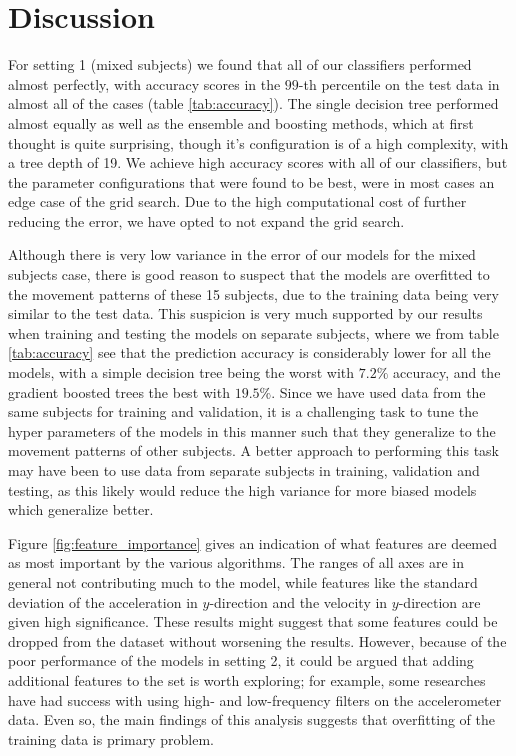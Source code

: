 \section{Discussion}\label{sec:Discussion}
For setting 1 (mixed subjects) we found that all of our classifiers performed almost perfectly, with accuracy scores in the $99$-th percentile on the test data in almost all of the cases (table \ref{tab:accuracy}). The single decision tree performed almost equally as well as the ensemble and boosting methods, which at first thought is quite surprising, though it's configuration is of a high complexity, with a tree depth of 19. We achieve high accuracy scores with all of our classifiers, but the parameter configurations that were found to be best, were in most cases an edge case of the grid search. Due to the high computational cost of further reducing the error, we have opted to not expand the grid search. 

Although there is very low variance in the error of our models for the mixed subjects case, there is good reason to suspect that the models are overfitted to the movement patterns of these 15 subjects, due to the training data being very similar to the test data. This suspicion is very much supported by our results when training and testing the models on separate subjects, where we from table \ref{tab:accuracy} see that the prediction accuracy is considerably lower for all the models, with a simple decision tree being the worst with $7.2\%$ accuracy, and the gradient boosted trees the best with $19.5\%$. Since we have used data from the same subjects for training and validation, it is a challenging task to tune the hyper parameters of the models in this manner such that they generalize to the movement patterns of other subjects. A better approach to performing this task may have been to use data from separate subjects in training, validation and testing, as this likely would reduce the high variance for more biased models which generalize better. 

Figure \ref{fig:feature_importance} gives an indication of what features are deemed as most important by the various algorithms. The ranges of all axes are in general not contributing much to the model, while features like the standard deviation of the acceleration in $y$-direction and the velocity in $y$-direction are given high significance. These results might suggest that some features could be dropped from the dataset without worsening the results. However, because of the poor performance of the models in setting 2, it could be argued that adding additional features to the set is worth exploring; for example, some researches have had success with using high- and low-frequency filters on the accelerometer data\cite{Casale2011}. Even so, the main findings of this analysis suggests that overfitting of the training data is primary problem.

